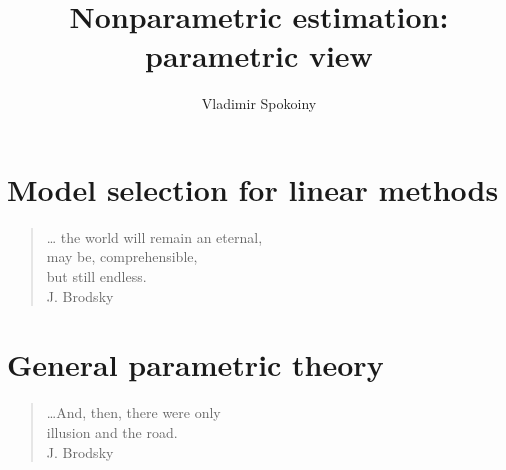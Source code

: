 \documentclass[reqno,envcountsect,11pt]{svmono}
\def\thetitle{Nonparametric estimation: parametric view}
\numberwithin{equation}{chapter}
\numberwithin{figure}{chapter}
\numberwithin{example}{section}
\numberwithin{exercise}{section}
\numberwithin{remark}{section}
\begin{document}
\author{
Vladimir Spokoiny 
}

\title{\thetitle}

\maketitle
\tableofcontents

\part{Model selection for linear methods}
\begin{quote}
\begin{flushright}                                      
\ldots 
the world will remain an eternal, 	\\
may be, comprehensible,				\\
but still endless.					\\[12pt]
J. Brodsky
\end{flushright}                                  
\end{quote}




 
 
 
 
 

\part{General parametric theory}
\begin{quote}
\begin{flushright}                                      
\ldots And, then, there were only		\\
illusion and the road.				\\[12pt]
J. Brodsky
\end{flushright}                                  
\end{quote}


%
%
%
%
%
%
%



%

%
%

%
\end{document}

